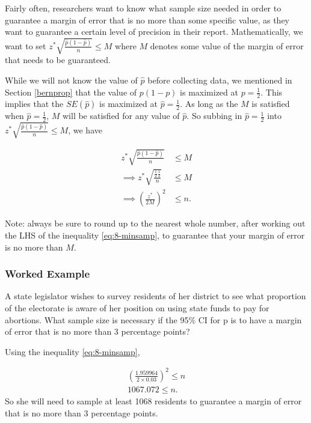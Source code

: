 \documentclass[
]{book}
\begin{document}
Fairly often, researchers want to know what sample size needed in order to guarantee a margin of error that is no more than some specific value, as they want to guarantee a certain level of precision in their report. Mathematically, we want to set \(z^{*} \sqrt{\frac{\hat{p}(1-\hat{p})}{n}} \leq M\) where \(M\) denotes some value of the margin of error that needs to be guaranteed.

While we will not know the value of \(\hat{p}\) before collecting data, we mentioned in Section \ref{bernprop} that the value of \(p(1-p)\) is maximized at \(p=\frac{1}{2}\). This implies that the \(SE(\hat{p})\) is maximized at \(\hat{p} = \frac{1}{2}\). As long as the \(M\) is satisfied when \(\hat{p} = \frac{1}{2}\), \(M\) will be satisfied for any value of \(\hat{p}\). So subbing in \(\hat{p} = \frac{1}{2}\) into \(z^{*} \sqrt{\frac{\hat{p}(1-\hat{p})}{n}} \leq M\), we have

\begin{equation} 
\begin{split}
z^{*} \sqrt{\frac{\hat{p}(1-\hat{p})}{n}} & \leq M \\
\implies z^* \sqrt{\frac{\frac{1}{2}\frac{1}{2}}{n}}  & \leq M \\
\implies \left(\frac{z^*}{2M}\right)^2 & \leq n.
\end{split}
\label{eq:8-minsamp}
\end{equation}

Note: always be sure to round up to the nearest whole number, after working out the LHS of the inequality \eqref{eq:8-minsamp}, to guarantee that your margin of error is no more than \(M\).

\hypertarget{worked-example-4}{%
\subsubsection{Worked Example}\label{worked-example-4}}

A state legislator wishes to survey residents of her district to see what proportion of the electorate is aware of her position on using state funds to pay for abortions. What sample size is necessary if the 95\% CI for p is to have a margin of error that is no more than 3 percentage points?

Using the inequality \eqref{eq:8-minsamp},

\[
\begin{split}
\left(\frac{1.959964}{2 \times 0.03}\right)^2 \leq n \\
1067.072 \leq n.
\end{split}
\]
So she will need to sample at least 1068 residents to guarantee a margin of error that is no more than 3 percentage points.
\end{document}
